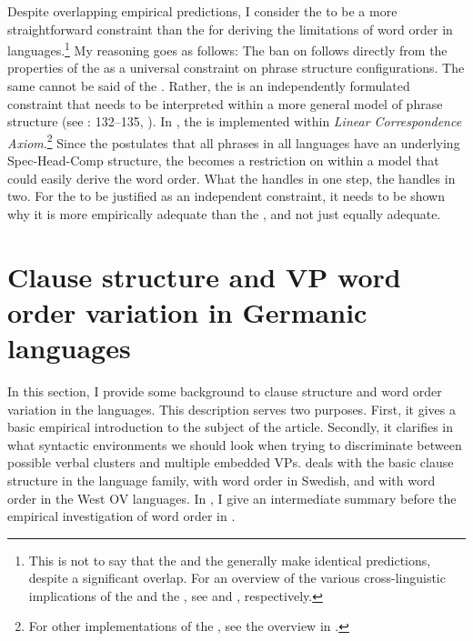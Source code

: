 \documentclass[output=paper, colorlinks, citecolor=brown]{langscibook}
\begin{document}
Despite overlapping empirical predictions, I consider the  to be a more straightforward constraint than the  for deriving the limitations of  word order in  languages.\footnote{This is not to say that the  and the  generally make identical predictions, despite a significant overlap. For an overview of the various cross-linguistic implications of the  and the , see \citet[10–17, 65–94]{Haider2013} and \citet[173–205]{BiberauerEtAl2014}, respectively.} My reasoning goes as follows: The ban on  follows directly from the properties of the  as a universal constraint on phrase structure configurations. The same cannot be said of the . Rather, the  is an independently formulated constraint that needs to be interpreted within a more general model of phrase structure (see \citealt{Haider2013}: 132–135, \citealt[205–215]{BiberauerEtAl2014}). In \citet{BiberauerEtAl2014}, the  is implemented within  \textit{Linear Correspondence Axiom}.\footnote{For other implementations of the , see the overview in \citet{Holmberg2017}.}  Since the  postulates that all phrases in all languages have an underlying Spec-Head-Comp structure, the  becomes a restriction on  within a model that could easily derive the  word order. What the  handles in one step, the  handles in two. For the  to be justified as an independent constraint, it needs to be shown why it is more empirically adequate than the , and not just equally adequate.


\section{Clause structure and VP word order variation in Germanic languages}\label{sec:sangfelt:3}

In this section, I provide some background to clause structure and  word order variation in the  languages. This description serves two purposes. First, it gives a basic empirical introduction to the subject of the article. Secondly, it clarifies in what syntactic environments we should look when trying to discriminate between possible verbal clusters and multiple embedded VPs.  deals with the basic clause structure in the  language family,  with  word order in Swedish, and  with  word order in the West  OV languages. In , I give an intermediate summary before the empirical investigation of  word order in .
\end{document}
